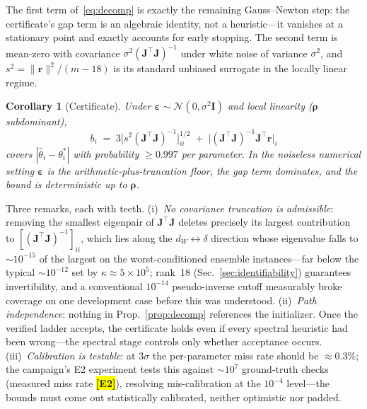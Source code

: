 \documentclass[twocolumn,preprintnumbers,amsmath,amssymb,pra,floatfix]{revtex4-2}
\newcommand{\vect}[1]{\bm{#1}}
\newtheorem{corollary}{Corollary}
\newcommand{\PH}[1]{\colorbox{yellow}{\textbf{\small [#1]}}}
\begin{document}
The first term of~\eqref{eq:decomp} is exactly the remaining
Gauss--Newton step: the certificate's gap term is an algebraic identity,
not a heuristic---it vanishes at a stationary point and exactly accounts
for early stopping.  The second term is mean-zero with covariance
$\sigma^{2}(\vect{J}^{\top}\vect{J})^{-1}$ under white noise of
variance $\sigma^{2}$, and $s^{2}
=\lVert\vect{r}\rVert^{2}/(m-18)$ is its standard unbiased surrogate in
the locally linear regime.

\begin{corollary}[Certificate]
\label{cor:cert}
Under $\vect{\varepsilon}\sim\mathcal{N}(0,\sigma^{2}\vect{I})$ and
local linearity ($\vect{\rho}$ subdominant),
\begin{equation}
  \label{eq:bounds}
  b_i \;=\; 3\big[s^2 (\vect{J}^{\top}\vect{J})^{-1}\big]_{ii}^{1/2}
  \;+\; \big|(\vect{J}^{\top}\vect{J})^{-1}\vect{J}^{\top}
  \vect{r}\big|_i
\end{equation}
covers $|\hat\theta_i-\theta_i^{*}|$ with probability $\ge 0.997$ per
parameter.  In the noiseless numerical setting $\vect{\varepsilon}$ is
the arithmetic-plus-truncation floor, the gap term dominates, and the
bound is deterministic up to $\vect{\rho}$.
\end{corollary}

Three remarks, each with teeth.  (i)~\emph{No covariance truncation is
admissible}: removing the smallest eigenpair of
$\vect{J}^{\top}\vect{J}$ deletes precisely its largest contribution to
$[(\vect{J}^{\top}\vect{J})^{-1}]_{ii}$, which lies along the
$d_W\!\leftrightarrow\!\delta$ direction whose eigenvalue falls to
$\sim\!10^{-15}$ of the largest on the worst-conditioned ensemble
instances---far below the typical $\sim\!10^{-12}$ set by
$\kappa\approx5\times10^{5}$; rank~18
(Sec.~\ref{sec:identifiability}) guarantees invertibility, and a
conventional $10^{-14}$ pseudo-inverse cutoff measurably broke coverage
on one development case before this was understood.
(ii)~\emph{Path independence}: nothing in
Prop.~\ref{prop:decomp} references the initializer.  Once the verified
ladder accepts, the certificate holds even if every spectral heuristic
had been wrong---the spectral stage controls only whether acceptance
occurs.  (iii)~\emph{Calibration is testable}: at $3\sigma$ the
per-parameter miss rate should be $\approx0.3\%$; the campaign's E2
experiment tests this against $\sim\!10^{7}$ ground-truth checks
(measured miss rate \PH{E2}), resolving mis-calibration at the
$10^{-4}$ level---the bounds must come out statistically calibrated,
neither optimistic nor padded.
\end{document}

